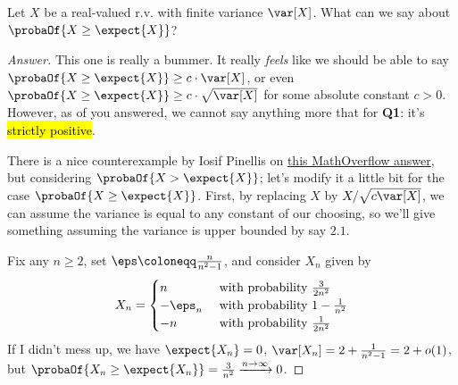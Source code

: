 \documentclass[10pt]{article}
\renewcommand{\eqdef}{\coloneqq}
\begin{document}
\begin{quest}
Let $X$ be a real-valued r.v. with finite variance $\var[X]$. What can we say about $\probaOf{X \geq \expect{X}}$?
\end{quest}
\begin{proof}[Answer]
This one is really a bummer. It really \emph{feels} like we should be able to say $\probaOf{X \geq \expect{X}} \geq c\cdot \var[X]$, or even $\probaOf{X \geq \expect{X}} \geq c\cdot \sqrt{\var[X]}$ for some absolute constant $c>0$. However, as  of you answered, we cannot say anything more that for \textbf{Q1}: it's \hl{strictly positive}.

There is a nice counterexample by Iosif Pinellis on \href{https://mathoverflow.net/a/358212/37266}{this MathOverflow answer}, but considering $\probaOf{X > \expect{X}}$; let's modify it a little bit for the case $\probaOf{X \geq \expect{X}}$. First, by replacing $X$ by $X/\sqrt{c\var[X]}$, we can assume the variance is equal to any constant of our choosing, so we'll give something assuming the variance is upper bounded by say $2.1$.\smallskip

\noindent Fix any $n\geq 2$, set $\eps \eqdef \frac{n}{n^2-1}$, and consider $X_n$ given by
\[
  X_n = \begin{cases}
      n & \text{ with probability } \frac{3}{2n^2}\\
      -\eps_n & \text{ with probability } 1-\frac{1}{n^2}\\
      -n & \text{ with probability } \frac{1}{2n^2}
    \end{cases}
\]
If I didn't mess up, we have $\expect{X_n}=0$, $\var[X_n] = 2+ \frac{1}{n^2-1} = 2+o(1)$, but $\probaOf{X_n \geq \expect{X_n}} = \frac{3}{n^2} \xrightarrow[]{n\to\infty} 0$.
\end{proof}
\end{document}
